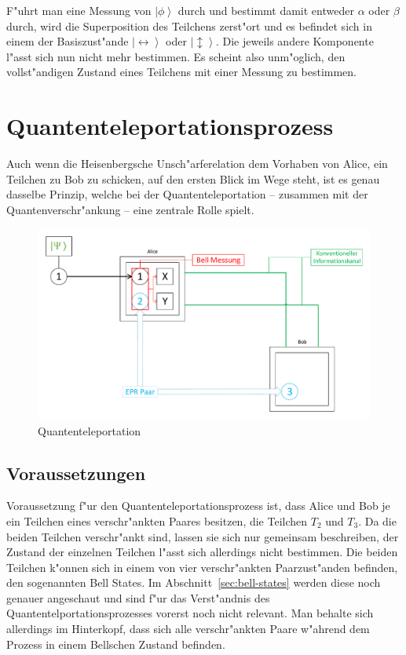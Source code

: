 \begin{refsection}
F"uhrt man eine Messung von $\left|\phi\right\rangle$ durch und bestimmt damit entweder $\alpha$ oder $\beta$ durch, wird die Superposition des Teilchens zerst"ort und es befindet sich in einem der Basiszust"ande $\left|\leftrightarrow\right\rangle$ oder $\left|\updownarrow\right\rangle$. Die jeweils andere Komponente l"asst sich nun nicht mehr bestimmen. Es scheint also unm"oglich, den vollst"andigen Zustand eines Teilchens mit einer Messung zu bestimmen.

\section{Quantenteleportationsprozess}

Auch wenn die Heisenbergsche Unsch"arferelation dem Vorhaben von Alice, ein Teilchen zu Bob zu schicken, auf den ersten Blick im Wege steht, ist es genau dasselbe Prinzip, welche bei der Quantenteleportation -- zusammen mit der Quantenverschr"ankung -- eine zentrale Rolle spielt.
\begin{figure}
	\center
	\includegraphics[width=1\textwidth]{teleport/image/quantum_com.pdf}
	\caption{Quantenteleportation}
	\label{Quantenteleportation}
\end{figure}

\subsection{Voraussetzungen}

Voraussetzung f"ur den Quantenteleportationsprozess ist, dass Alice und Bob je ein Teilchen eines verschr"ankten Paares besitzen, die Teilchen $T_{2}$ und $T_{3}$. Da die beiden Teilchen  verschr"ankt sind, lassen sie sich nur gemeinsam beschreiben, der Zustand der einzelnen Teilchen l"asst sich allerdings nicht bestimmen. Die beiden Teilchen k"onnen sich in einem von vier verschr"ankten Paarzust"anden befinden, den sogenannten Bell States. Im Abschnitt~\ref{sec:bell-states} werden diese noch genauer angeschaut und sind f"ur das Verst"andnis des Quantentelportationsprozesses vorerst noch nicht relevant. Man behalte sich allerdings im Hinterkopf, dass sich alle verschr"ankten Paare w"ahrend dem Prozess in einem Bellschen Zustand befinden.


\end{refsection}
